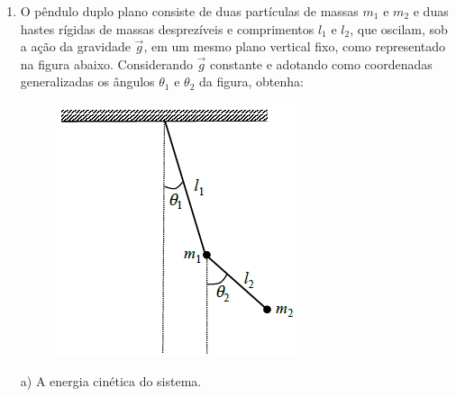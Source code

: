 \begin{enumerate}[start=1,label={\bfseries Q\arabic*.}]
\item O pêndulo duplo plano consiste de duas partículas de massas $m_{1}$ e $m_{2}$ e duas hastes rígidas de massas desprezíveis e comprimentos $l_{1}$ e $l_{2}$, que oscilam, sob a ação da gravidade $\vec{g}$, em um mesmo plano vertical fixo, como representado na figura abaixo. Considerando $\vec{g}$ constante e adotando como coordenadas generalizadas os ângulos $\theta_{1}$ e $\theta_{2}$ da figura, obtenha:

\begin{figure}[H]
\centering
\includegraphics[scale=1]{classica-img/pendulo2.png}
\end{figure}


a) A energia cinética do sistema.


\end{enumerate}
